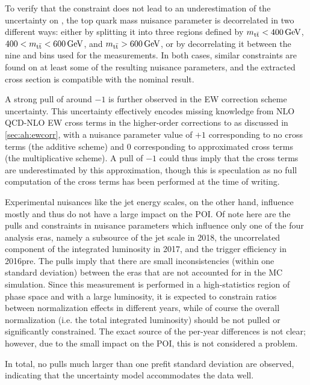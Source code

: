 To verify that the constraint does not lead to an underestimation of the uncertainty on \sigetat, the top quark mass nuisance parameter is decorrelated in two different ways: either by splitting it into three regions defined by $\mtt<\SI{400}{\GeV}$, $400<\mtt<\SI{600}{\GeV}$, and $\mtt>\SI{600}{\GeV}$, or by decorrelating it between the nine \chel and \chan bins used for the measurements. In both cases, similar constraints are found on at least some of the resulting nuisance parameters, and the extracted \etat cross section is compatible with the nominal result.

A strong pull of around $-1$ is further observed in the EW correction scheme uncertainty. This uncertainty effectively encodes missing knowledge from NLO QCD-NLO EW cross terms in the higher-order corrections to \ttbar as discussed in \cref{sec:ah:ewcorr}, with a nuisance parameter value of $+1$ corresponding to no cross terms (the additive scheme) and $0$ corresponding to approximated cross terms (the multiplicative scheme). A pull of $-1$ could thus imply that the cross terms are underestimated by this approximation, though this is speculation as no full computation of the cross terms has been performed at the time of writing.

Experimental nuisances like the jet energy scales, on the other hand, influence mostly \mtt and thus do not have a large impact on the POI. 
Of note here are the pulls and constraints in nuisance parameters which influence only one of the four analysis eras, namely a subsource of the jet \pt scale in 2018, the uncorrelated component of the integrated luminosity in 2017, and the \emu trigger efficiency in 2016pre. The pulls imply that there are small inconsistencies (within one standard deviation) between the eras that are not accounted for in the MC simulation. Since this measurement is performed in a high-statistics region of phase space and with a large luminosity, it is expected to constrain ratios between normalization effects in different years, while of course the overall normalization (i.e. the total integrated luminosity) should be not pulled or significantly constrained.
The exact source of the per-year differences is not clear; however, due to the small impact on the POI, this is not considered a problem.

In total, no pulls much larger than one prefit standard deviation are observed, indicating that the uncertainty model accommodates the data well.

